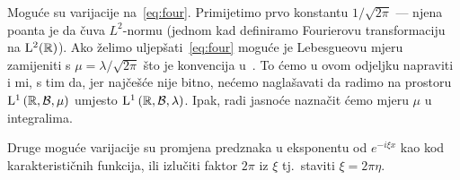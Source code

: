 \documentclass[main.tex]{subfiles}
\begin{document}
\begin{komentar}\label{kom:four1}
	Moguće su varijacije na~\eqref{eq:four}.
	Primijetimo prvo konstantu \( 1/\sqrt{2\pi} \) --- njena poanta je da čuva
	\( L^2 \)-normu (jednom kad definiramo Fourierovu transformaciju na \( \mathrm{L}^2(\mathbb{R}) \)).
	Ako želimo uljepšati~\eqref{eq:four} moguće je Lebesgueovu mjeru
	zamijeniti s \( \mu = \lambda/\sqrt{2\pi} \) što je konvencija
	u~\cite[]{rudin}. To ćemo u ovom odjeljku napraviti i mi,
	s tim da, jer najčešće nije bitno, nećemo naglašavati da radimo
	na prostoru \( \mathrm{L}^1\left( \mathbb{R}, \mathcal B, \mu \right) \) umjesto
	\( \mathrm{L}^1\left(\mathbb{R}, \mathcal B, \lambda \right) \). Ipak, radi jasnoće naznačit ćemo
	mjeru \( \mu \) u integralima.

	Druge moguće varijacije su promjena predznaka u eksponentu od
	\( e^{-i\xi x} \) kao kod karakterističnih funkcija, ili izlučiti faktor
	\( 2\pi \) iz \( \xi \) tj.\ staviti \( \xi = 2\pi\eta \).
\end{komentar}
\end{document}
